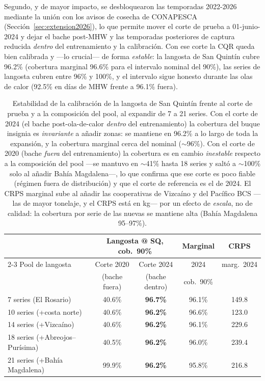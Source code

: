 Segundo, y de mayor impacto, se desbloquearon las temporadas 2022-2026 mediante la unión con los avisos de cosecha de CONAPESCA (Sección~\ref{sec:extension2026}), lo que permite mover el corte de prueba a 01-junio-2024 y dejar el bache post-MHW y las temporadas posteriores de captura reducida \emph{dentro} del entrenamiento y la calibración. Con ese corte la CQR queda bien calibrada y ---lo crucial--- de forma \emph{estable}: la langosta de San Quintín cubre 96.2\% (cobertura marginal 96.6\% para el intervalo nominal del 90\%), las series de langosta cubren entre 96\% y 100\%, y el intervalo sigue honesto durante las olas de calor (92.5\% en días de MHW frente a 96.1\% fuera).

\begin{table}[htbp]
\centering
\small
\begin{tabular}{p{4.6cm}cccc}
\toprule
 & \multicolumn{2}{c}{Langosta @ SQ, cob.\ 90\%} & Marginal & CRPS \\
\cmidrule(lr){2-3}
Pool de langosta & Corte 2020 & Corte 2024 & 2024 & marg.\ 2024 \\
 & (bache fuera) & (bache dentro) & cob.\ 90\% & \\
\midrule
7 series (El Rosario) & 40.6\% & \textbf{96.7\%} & 96.1\% & 149.8 \\
10 series (+costa norte) & 40.6\% & \textbf{96.2\%} & 96.6\% & 123.0 \\
14 series (+Vizcaíno) & 40.6\% & \textbf{96.2\%} & 96.1\% & 229.6 \\
18 series (+Abreojos--Purísima) & 40.5\% & \textbf{96.2\%} & 96.0\% & 239.4 \\
21 series (+Bahía Magdalena) & 99.9\% & \textbf{96.2\%} & 95.8\% & 216.8 \\
\bottomrule
\end{tabular}
\caption{Estabilidad de la calibración de la langosta de San Quintín frente al corte de prueba y a la composición del pool, al expandir de 7 a 21 series. Con el corte de 2024 (el bache post-ola-de-calor \emph{dentro} del entrenamiento) la cobertura del buque insignia es \emph{invariante} a añadir zonas: se mantiene en 96.2\% a lo largo de toda la expansión, y la cobertura marginal cerca del nominal ($\sim$96\%). Con el corte de 2020 (bache \emph{fuera} del entrenamiento) la cobertura es en cambio \emph{inestable} respecto a la composición del pool ---se mantuvo en $\sim$41\% hasta 18 series y saltó a $\sim$100\% solo al añadir Bahía Magdalena---, lo que confirma que ese corte es poco fiable (régimen fuera de distribución) y que el corte de referencia es el de 2024. El CRPS marginal sube al añadir las cooperativas de Vizcaíno y del Pacífico BCS ---las de mayor tonelaje, y el CRPS está en kg--- por un efecto de \emph{escala}, no de calidad: la cobertura por serie de las nuevas se mantiene alta (Bahía Magdalena 95--97\%).}
\label{tab:extension_moredata}
\end{table}

